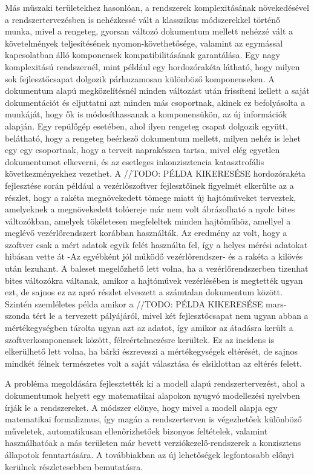         Más műszaki területekhez hasonlóan, a rendszerek komplexitásának növekedésével a rendszertervezésben is nehézkessé vált a klasszikus módszerekkel történő munka, mivel a rengeteg, gyorsan változó dokumentum mellett nehézzé vált a követelmények teljesítésének nyomon-követhetősége, valamint az egymással kapcsolatban álló komponensek kompatibilitásának garantálása.
        Egy nagy komplexitású rendszernél, mint például egy hordozórakéta látható, hogy milyen sok fejlesztőcsapat dolgozik párhuzamosan különböző komponenseken. A dokumentum alapú megközelítésnél minden változást után frissíteni kellett a saját dokumentációt és eljuttatni azt minden más csoportnak, akinek ez befolyásolta a munkáját, hogy ők is módosíthassanak a komponensükön, az új információk alapján.
        Egy repülőgép esetében, ahol ilyen rengeteg csapat dolgozik együtt, belátható, hogy a rengeteg beérkező dokumentum mellett, milyen nehéz is lehet egy egy csoportnak, hogy a terveit naprakészen tartsa, mivel elég egyetlen dokumentumot elkeverni, és az esetleges inkonzisztencia katasztrofális következményekhez vezethet.
        A //TODO: PÉLDA KIKERESÉSE hordozórakéta fejlesztése során például a vezérlőszoftver fejlesztőinek figyelmét elkerülte az a részlet, hogy a rakéta megnövekedett tömege miatt új hajtóműveket terveztek, amelyeknek a megnövekedett tolóereje már nem volt ábrázolható a nyolc bites változókban, amelyek tökéletesen megfeleltek minden hajtőműhöz, amellyel a meglévő vezérlőrendszert korábban használták.
        Az eredmény az volt, hogy a szoftver csak a mért adatok egyik felét használta fel, így a helyes mérési adatokat hibásan vette át -Az egyébként jól működő vezérlőrendszer- és a rakéta a kilövés után lezuhant.
        A baleset megelőzhető lett volna, ha a vezérlőrendszerben tizenhat bites változókra váltanak, amikor a hajtóművek vezérlésében is megtették ugyan ezt, de sajnos ez az apró részlet elveszett a számtalan dokumentum között.
        Szintén szemléletes példa amikor a //TODO: PÉLDA KIKERESÉSE mars-szonda tért le a tervezett pályájáról, mivel két fejlesztőcsapat nem ugyan abban a mértékegységben tárolta ugyan azt az adatot, így amikor az átadásra került a szoftverkomponensek között, félreértelmezésre kerültek. Ez az incidens is elkerülhető lett volna, ha bárki észreveszi a mértékegységek eltérését, de sajnos mindkét félnek természetes volt a saját választása és elsiklottan az eltérés felett.

        A probléma megoldására fejlesztették ki a modell alapú rendszertervezést, ahol a dokumentumok helyett egy matematikai alapokon nyugvó modellezési nyelvben írják le a rendszereket. A módszer előnye, hogy mivel a modell alapja egy matematikai formalizmus, így magán a rendszerterven is végezhetőek különböző műveletek, automatikusan ellenőrizhetőek bizonyos feltételek, valamint használhatóak a más területen már bevett verziókezelő-rendszerek a konzisztens állapotok fenntartására.
        A továbbiakban az új lehetőségek legfontosabb előnyi kerülnek részletesebben bemutatásra.
        
